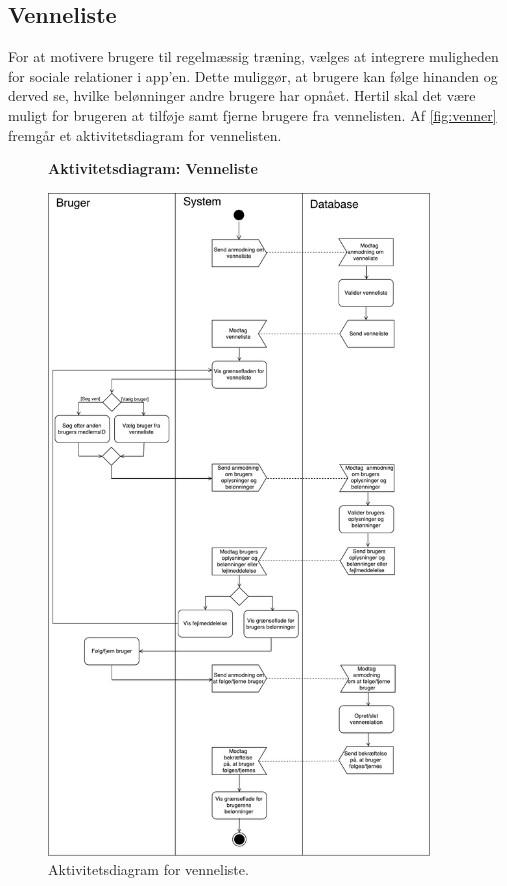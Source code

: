 \subsection*{Venneliste} 
For at motivere brugere til regelmæssig træning, vælges at integrere muligheden for sociale relationer i app'en. Dette muliggør, at brugere kan følge hinanden og derved se, hvilke belønninger andre brugere har opnået. Hertil skal det være muligt for brugeren at tilføje samt fjerne brugere fra vennelisten. 
Af \autoref{fig:venner} fremgår et aktivitetsdiagram for vennelisten.

\begin{figure} [H]
\centering
\textbf{Aktivitetsdiagram: Venneliste}\par\medskip
\includegraphics[width=0.9\textwidth]{figures/aktivitetsdiagram/venner}
\caption{Aktivitetsdiagram for venneliste.}
\label{fig:venner}
\end{figure}


